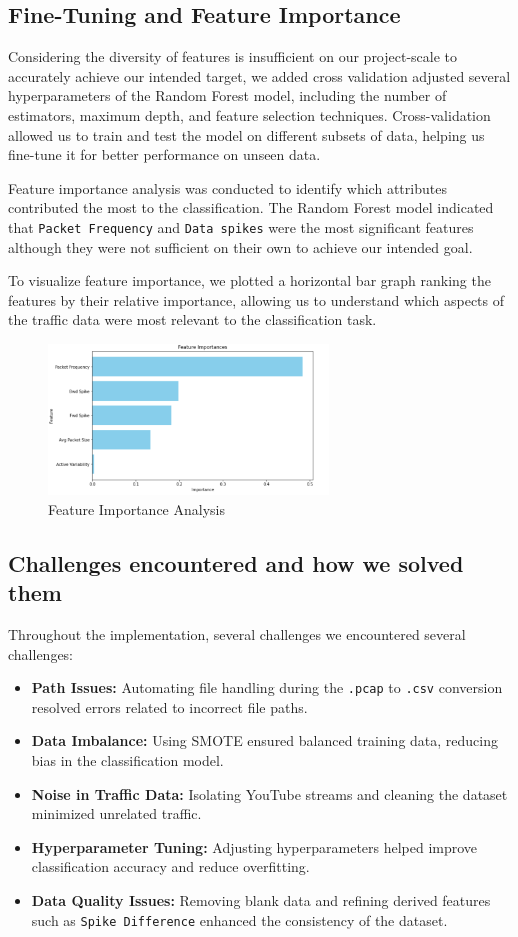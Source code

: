\subsection{Fine-Tuning and Feature Importance}
Considering the diversity of features is insufficient on our project-scale to accurately achieve our intended target, we added cross validation adjusted several hyperparameters of the Random Forest model, including the number of estimators, maximum depth, and feature selection techniques. Cross-validation allowed us to train and test the model on different subsets of data, helping us fine-tune it for better performance on unseen data.

Feature importance analysis was conducted to identify which attributes contributed the most to the classification. The Random Forest model indicated that \texttt{Packet Frequency} and \texttt{Data spikes} were the most significant features although they were not sufficient on their own to achieve our intended goal.

To visualize feature importance, we plotted a horizontal bar graph ranking the features by their relative importance, allowing us to understand which aspects of the traffic data were most relevant to the classification task.

\begin{figure}[H]
    \centering
    \includegraphics[height=4cm]{features_importance.png} 
    \caption{Feature Importance Analysis}
    \label{fig:features_importance}
\end{figure}


\subsection{Challenges encountered and how we solved them}
Throughout the implementation, several challenges we encountered several challenges:
\begin{itemize}
    \item \textbf{Path Issues:} Automating file handling during the \texttt{.pcap} to \texttt{.csv} conversion resolved errors related to incorrect file paths.
    \item \textbf{Data Imbalance:} Using SMOTE ensured balanced training data, reducing bias in the classification model.
    \item \textbf{Noise in Traffic Data:} Isolating YouTube streams and cleaning the dataset minimized unrelated traffic.
    \item \textbf{Hyperparameter Tuning:} Adjusting hyperparameters helped improve classification accuracy and reduce overfitting.
    \item \textbf{Data Quality Issues:} Removing blank data and refining derived features such as \texttt{Spike Difference} enhanced the consistency of the dataset.
\end{itemize}

